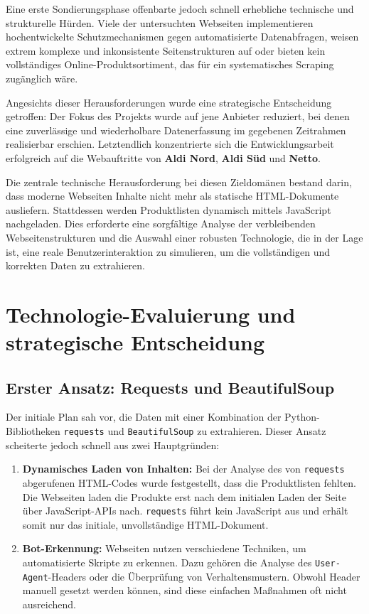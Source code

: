 \documentclass[12pt, a4paper]{report} %
\begin{document}
Eine erste Sondierungsphase offenbarte jedoch schnell erhebliche technische und strukturelle Hürden. Viele der untersuchten Webseiten implementieren hochentwickelte Schutzmechanismen gegen automatisierte Datenabfragen, weisen extrem komplexe und inkonsistente Seitenstrukturen auf oder bieten kein vollständiges Online-Produktsortiment, das für ein systematisches Scraping zugänglich wäre.

Angesichts dieser Herausforderungen wurde eine strategische Entscheidung getroffen: Der Fokus des Projekts wurde auf jene Anbieter reduziert, bei denen eine zuverlässige und wiederholbare Datenerfassung im gegebenen Zeitrahmen realisierbar erschien. Letztendlich konzentrierte sich die Entwicklungsarbeit erfolgreich auf die Webauftritte von \textbf{Aldi Nord}, \textbf{Aldi Süd} und \textbf{Netto}.

Die zentrale technische Herausforderung bei diesen Zieldomänen bestand darin, dass moderne Webseiten Inhalte nicht mehr als statische HTML-Dokumente ausliefern. Stattdessen werden Produktlisten dynamisch mittels JavaScript nachgeladen. Dies erforderte eine sorgfältige Analyse der verbleibenden Webseitenstrukturen und die Auswahl einer robusten Technologie, die in der Lage ist, eine reale Benutzerinteraktion zu simulieren, um die vollständigen und korrekten Daten zu extrahieren.

\section{Technologie-Evaluierung und strategische Entscheidung}
\subsection{Erster Ansatz: Requests und BeautifulSoup}
Der initiale Plan sah vor, die Daten mit einer Kombination der Python-Bibliotheken \texttt{requests} und \texttt{BeautifulSoup} zu extrahieren. Dieser Ansatz scheiterte jedoch schnell aus zwei Hauptgründen:
\begin{enumerate}
    \item \textbf{Dynamisches Laden von Inhalten:} Bei der Analyse des von \texttt{requests} abgerufenen HTML-Codes wurde festgestellt, dass die Produktlisten fehlten. Die Webseiten laden die Produkte erst nach dem initialen Laden der Seite über JavaScript-APIs nach. \texttt{requests} führt kein JavaScript aus und erhält somit nur das initiale, unvollständige HTML-Dokument.
    \item \textbf{Bot-Erkennung:} Webseiten nutzen verschiedene Techniken, um automatisierte Skripte zu erkennen. Dazu gehören die Analyse des \texttt{User-Agent}-Headers oder die Überprüfung von Verhaltensmustern. Obwohl Header manuell gesetzt werden können, sind diese einfachen Maßnahmen oft nicht ausreichend.
\end{enumerate}
\end{document}
